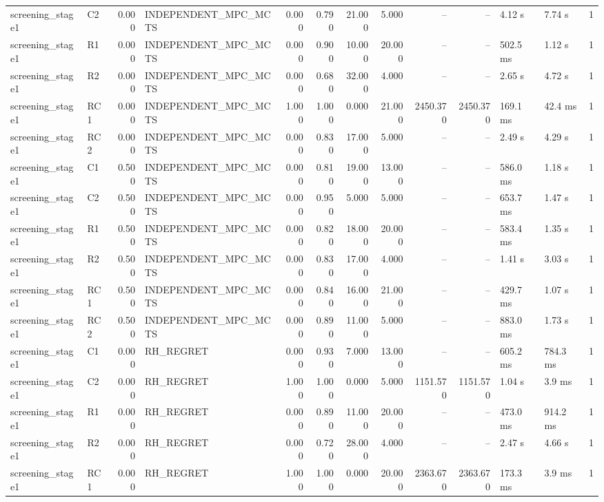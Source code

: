 \begin{table}
{\begin{tabular}{llrlrrrrrrllr}
screening\_stage1 & C2 & 0.000 & INDEPENDENT\_MPC\_MCTS & 0.000 & 0.790 & 21.000 & 5.000 & -- & -- & 4.12 s & 7.74 s & 1 \\
screening\_stage1 & R1 & 0.000 & INDEPENDENT\_MPC\_MCTS & 0.000 & 0.900 & 10.000 & 20.000 & -- & -- & 502.5 ms & 1.12 s & 1 \\
screening\_stage1 & R2 & 0.000 & INDEPENDENT\_MPC\_MCTS & 0.000 & 0.680 & 32.000 & 4.000 & -- & -- & 2.65 s & 4.72 s & 1 \\
screening\_stage1 & RC1 & 0.000 & INDEPENDENT\_MPC\_MCTS & 1.000 & 1.000 & 0.000 & 21.000 & 2450.370 & 2450.370 & 169.1 ms & 42.4 ms & 1 \\
screening\_stage1 & RC2 & 0.000 & INDEPENDENT\_MPC\_MCTS & 0.000 & 0.830 & 17.000 & 5.000 & -- & -- & 2.49 s & 4.29 s & 1 \\
screening\_stage1 & C1 & 0.500 & INDEPENDENT\_MPC\_MCTS & 0.000 & 0.810 & 19.000 & 13.000 & -- & -- & 586.0 ms & 1.18 s & 1 \\
screening\_stage1 & C2 & 0.500 & INDEPENDENT\_MPC\_MCTS & 0.000 & 0.950 & 5.000 & 5.000 & -- & -- & 653.7 ms & 1.47 s & 1 \\
screening\_stage1 & R1 & 0.500 & INDEPENDENT\_MPC\_MCTS & 0.000 & 0.820 & 18.000 & 20.000 & -- & -- & 583.4 ms & 1.35 s & 1 \\
screening\_stage1 & R2 & 0.500 & INDEPENDENT\_MPC\_MCTS & 0.000 & 0.830 & 17.000 & 4.000 & -- & -- & 1.41 s & 3.03 s & 1 \\
screening\_stage1 & RC1 & 0.500 & INDEPENDENT\_MPC\_MCTS & 0.000 & 0.840 & 16.000 & 21.000 & -- & -- & 429.7 ms & 1.07 s & 1 \\
screening\_stage1 & RC2 & 0.500 & INDEPENDENT\_MPC\_MCTS & 0.000 & 0.890 & 11.000 & 5.000 & -- & -- & 883.0 ms & 1.73 s & 1 \\
screening\_stage1 & C1 & 0.000 & RH\_REGRET & 0.000 & 0.930 & 7.000 & 13.000 & -- & -- & 605.2 ms & 784.3 ms & 1 \\
screening\_stage1 & C2 & 0.000 & RH\_REGRET & 1.000 & 1.000 & 0.000 & 5.000 & 1151.570 & 1151.570 & 1.04 s & 3.9 ms & 1 \\
screening\_stage1 & R1 & 0.000 & RH\_REGRET & 0.000 & 0.890 & 11.000 & 20.000 & -- & -- & 473.0 ms & 914.2 ms & 1 \\
screening\_stage1 & R2 & 0.000 & RH\_REGRET & 0.000 & 0.720 & 28.000 & 4.000 & -- & -- & 2.47 s & 4.66 s & 1 \\
screening\_stage1 & RC1 & 0.000 & RH\_REGRET & 1.000 & 1.000 & 0.000 & 20.000 & 2363.670 & 2363.670 & 173.3 ms & 3.9 ms & 1 \\

\end{tabular}}
\end{table}

